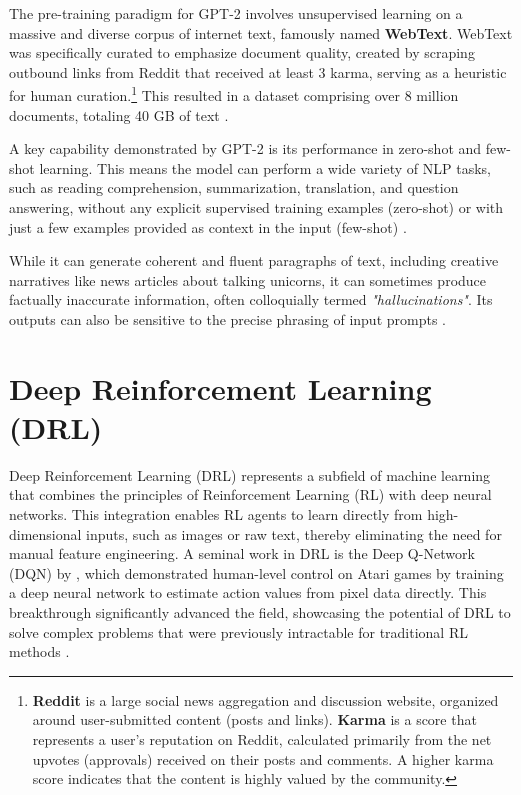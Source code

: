 The pre-training paradigm for GPT-2 involves unsupervised learning on a massive and diverse corpus of internet text, famously named \textbf{WebText}. WebText was specifically curated to emphasize document quality, created by scraping outbound links from Reddit that received at least 3 karma, serving as a heuristic for human curation.\footnote{
    \textbf{Reddit} is a large social news aggregation and discussion website, organized around user-submitted content (posts and links).
    \textbf{Karma} is a score that represents a user's reputation on Reddit, calculated primarily from the net upvotes (approvals) received on their posts and comments. A higher karma score indicates that the content is highly valued by the community.
} This resulted in a dataset comprising over 8 million documents, totaling 40 GB of text \cite{radford2019language}.

A key capability demonstrated by GPT-2 is its performance in zero-shot and few-shot learning. This means the model can perform a wide variety of NLP tasks, such as reading comprehension, summarization, translation, and question answering, without any explicit supervised training examples (zero-shot) or with just a few examples provided as context in the input (few-shot) \cite{radford2019language}. 

While it can generate coherent and fluent paragraphs of text, including creative narratives like news articles about talking unicorns, it can sometimes produce factually inaccurate information, often colloquially termed \textit{"hallucinations"}. Its outputs can also be sensitive to the precise phrasing of input prompts \cite{radford2019language}.


\section{Deep Reinforcement Learning (DRL)}
Deep Reinforcement Learning (DRL) represents a subfield of machine learning that combines the principles of Reinforcement Learning (RL) with deep neural networks. This integration enables RL agents to learn directly from high-dimensional inputs, such as images or raw text, thereby eliminating the need for manual feature engineering. A seminal work in DRL is the Deep Q-Network (DQN) by \cite{Mnih2015HumanlevelCT}, which demonstrated human-level control on Atari games by training a deep neural network to estimate action values from pixel data directly. This breakthrough significantly advanced the field, showcasing the potential of DRL to solve complex problems that were previously intractable for traditional RL methods \cite{Mnih2015HumanlevelCT}.

